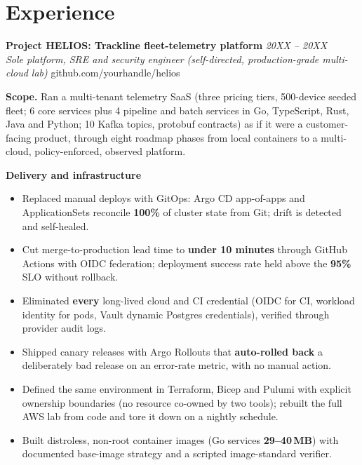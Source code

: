 \documentclass[10pt,letterpaper]{article}
\newcommand{\role}[4]{%
  \textbf{#1} \hfill \textit{#3}\\[-1pt]
  {\small\textit{#2}} \hfill {\small #4}\par\vspace{2pt}}
\newcommand{\theme}[1]{\vspace{3pt}\textbf{\color{accent}#1}\par\vspace{-1pt}}
\begin{document}
\section{Experience}

\role{Project HELIOS: Trackline fleet-telemetry platform}{Sole platform, SRE and security engineer \;(self-directed, production-grade multi-cloud lab)}{20XX -- 20XX}{github.com/yourhandle/helios}

\textbf{Scope.} Ran a multi-tenant telemetry SaaS (three pricing tiers, 500-device seeded fleet; 6 core services plus 4 pipeline and batch services in Go, TypeScript, Rust, Java and Python; 10 Kafka topics, protobuf contracts) as if it were a customer-facing product, through eight roadmap phases from local containers to a multi-cloud, policy-enforced, observed platform. %

\theme{Delivery and infrastructure}
\begin{itemize}
  \item Replaced manual deploys with GitOps: Argo CD app-of-apps and ApplicationSets reconcile \textbf{100\%} of cluster state from Git; drift is detected and self-healed. %
  \item Cut merge-to-production lead time to \textbf{under 10 minutes} through GitHub Actions with OIDC federation; deployment success rate held above the \textbf{95\%} SLO without rollback. %
  \item Eliminated \textbf{every} long-lived cloud and CI credential (OIDC for CI, workload identity for pods, Vault dynamic Postgres credentials), verified through provider audit logs. %
  \item Shipped canary releases with Argo Rollouts that \textbf{auto-rolled back} a deliberately bad release on an error-rate metric, with no manual action. %
  \item Defined the same environment in Terraform, Bicep and Pulumi with explicit ownership boundaries (no resource co-owned by two tools); rebuilt the full AWS lab from code and tore it down on a nightly schedule. %
  \item Built distroless, non-root container images (Go services \textbf{29--40\,MB}) with documented base-image strategy and a scripted image-standard verifier. %
\end{itemize}
\end{document}
